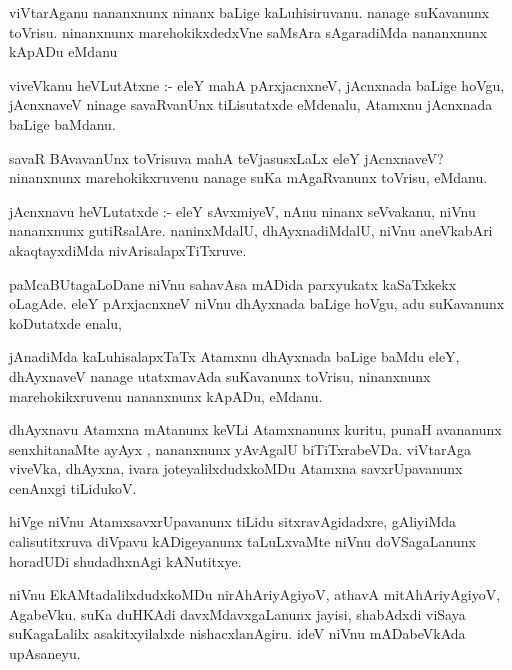 \documentclass{article}
\begin{document}
\begin{mn}
viVtarAganu nananxnunx ninanx baLige kaLuhisiruvanu.  nanage suKavanunx
toVrisu. ninanxnunx marehokikxdedxVne saMsAra sAgaradiMda nananxnunx kApADu eMdanu
\end{mn}

\begin{mn}
viveVkanu heVLutAtxne :- eleY mahA pArxjacnxneV, jAcnxnada baLige hoVgu, 
jAcnxnaveV ninage savaRvanUnx tiLisutatxde eMdenalu, Atamxnu jAcnxnada baLige baMdanu.
\end{mn}

\begin{mn}
savaR BAvavanUnx toVrisuva mahA teVjasusxLaLx eleY jAcnxnaveV? ninanxnunx
 marehokikxruvenu nanage suKa mAgaRvanunx toVrisu, eMdanu.
\end{mn}

\begin{mn}
jAcnxnavu heVLutatxde :- eleY sAvxmiyeV, nAnu ninanx seVvakanu, niVnu 
nananxnunx gutiRsalAre. naninxMdalU, dhAyxnadiMdalU, niVnu aneVkabAri 
akaqtayxdiMda nivArisalapxTiTxruve.
\end{mn}

\begin{mn}
paMcaBUtagaLoDane niVnu sahavAsa mADida parxyukatx kaSaTxkekx oLagAde. 
eleY pArxjacnxneV niVnu dhAyxnada baLige hoVgu, adu suKavanunx koDutatxde enalu,		
\end{mn}

\begin{mn}
jAnadiMda kaLuhisalapxTaTx Atamxnu dhAyxnada baLige baMdu eleY, dhAyxnaveV 
nanage utatxmavAda suKavanunx toVrisu, ninanxnunx marehokikxruvenu nananxnunx
 kApADu, eMdanu.
\end{mn}

\begin{mn}
dhAyxnavu Atamxna mAtanunx keVLi Atamxnanunx  kuritu, punaH avananunx 
senxhitanaMte ayAyx , nananxnunx yAvAgalU biTiTxrabeVDa. viVtarAga viveVka,
dhAyxna, ivara joteyalilxdudxkoMDu Atamxna savxrUpavanunx  cenAnxgi tiLidukoV.
\end{mn}

\begin{mn}
hiVge niVnu AtamxsavxrUpavanunx tiLidu sitxravAgidadxre, gAliyiMda 
calisutitxruva diVpavu kADigeyanunx taLuLxvaMte niVnu doVSagaLanunx  horadUDi
shudadhxnAgi kANutitxye. 
\end{mn}

\begin{mn}
niVnu EkAMtadalilxdudxkoMDu nirAhAriyAgiyoV, athavA mitAhAriyAgiyoV, AgabeVku. 
suKa duHKAdi davxMdavxgaLanunx jayisi, shabAdxdi viSaya suKagaLalilx asakitxyilalxde 
nishacxlanAgiru. ideV niVnu mADabeVkAda upAsaneyu.
\end{mn}
\end{document}
